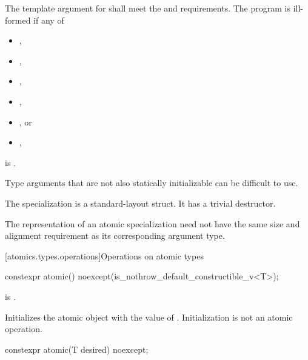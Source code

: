 %
\pnum
The template argument for  shall meet the
 and  requirements.
The program is ill-formed if any of
\begin{itemize}
\item {},
\item {},
\item {},
\item {},
\item {}, or
\item {},
\end{itemize}
is .
\begin{note}
Type arguments that are
not also statically initializable can be difficult to use.
\end{note}

\pnum
The specialization  is a standard-layout struct.
It has a trivial destructor.

\pnum
\begin{note}
The representation of an atomic specialization
need not have the same size and alignment requirement as
its corresponding argument type.
\end{note}

[atomics.types.operations]{Operations on atomic types}

%
%
%
%
\begin{itemdecl}
constexpr atomic() noexcept(is_nothrow_default_constructible_v<T>);
\end{itemdecl}

\begin{itemdescr}
\pnum
\constraints
{} is .

\pnum
\effects
Initializes the atomic object with the value of .
Initialization is not an atomic operation.
\end{itemdescr}

%
%
%
%
\begin{itemdecl}
constexpr atomic(T desired) noexcept;
\end{itemdecl}

